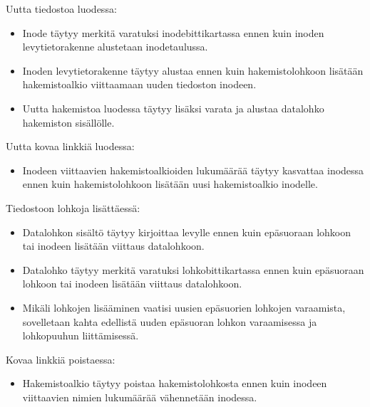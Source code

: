 
Uutta tiedostoa luodessa:
\begin{itemize}
    \item{Inode täytyy merkitä varatuksi inodebittikartassa ennen kuin inoden levytietorakenne alustetaan inodetaulussa.}
    \item{Inoden levytietorakenne täytyy alustaa ennen kuin hakemistolohkoon lisätään hakemistoalkio viittaamaan uuden tiedoston inodeen.}
    \item{Uutta hakemistoa luodessa täytyy lisäksi varata ja alustaa datalohko hakemiston sisällölle.}
\end{itemize}
Uutta kovaa linkkiä luodessa:
\begin{itemize}
    \item{Inodeen viittaavien hakemistoalkioiden lukumäärää täytyy kasvattaa inodessa ennen kuin hakemistolohkoon lisätään uusi hakemistoalkio inodelle.}
\end{itemize}
Tiedostoon lohkoja lisättäessä:
\begin{itemize}
    \item{Datalohkon sisältö täytyy kirjoittaa levylle ennen kuin epäsuoraan lohkoon tai inodeen lisätään viittaus datalohkoon.}
    \item{Datalohko täytyy merkitä varatuksi lohkobittikartassa ennen kuin epäsuoraan lohkoon tai inodeen lisätään viittaus datalohkoon.}
    \item{Mikäli lohkojen lisääminen vaatisi uusien epäsuorien lohkojen varaamista, sovelletaan kahta edellistä uuden epäsuoran lohkon varaamisessa ja lohkopuuhun liittämisessä.}
\end{itemize}
Kovaa linkkiä poistaessa:
\begin{itemize}
    \item{Hakemistoalkio täytyy poistaa hakemistolohkosta ennen kuin inodeen viittaavien nimien lukumäärää vähennetään inodessa.}
\end{itemize}
